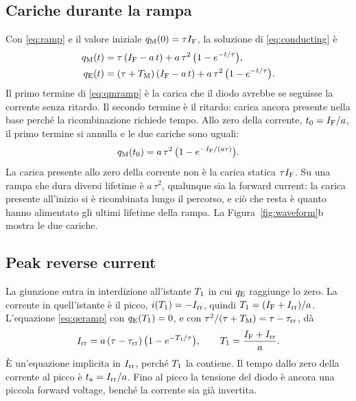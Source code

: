 \documentclass[10pt,a4paper]{scrartcl}
\let\newcommand\lmitdefine
\newcommand{\IF}{I_\mathrm{F}}
\newcommand{\Irr}{I_\mathrm{rr}}
\newcommand{\ta}{t_\mathrm{a}}
\newcommand{\taurr}{\tau_\mathrm{rr}}
\newcommand{\TM}{T_\mathrm{M}}
\newcommand{\Tone}{T_1}
\newcommand{\qE}{q_\mathrm{E}}
\newcommand{\qM}{q_\mathrm{M}}
\begin{document}
\subsection{Cariche durante la rampa}
Con \eqref{eq:ramp} e il valore iniziale $\qM(0) = \tau\IF$, la soluzione di \eqref{eq:conducting} è
\begin{align}
\qM(t) &= \tau\,(\IF - a\,t) + a\,\tau^2\,\bigl(1 - e^{-t/\tau}\bigr) , \label{eq:qmramp}\\
\qE(t) &= (\tau+\TM)\,(\IF - a\,t) + a\,\tau^2\,\bigl(1 - e^{-t/\tau}\bigr) . \label{eq:qeramp}
\end{align}
Il primo termine di \eqref{eq:qmramp} è la carica che il diodo avrebbe se seguisse la corrente senza ritardo. Il secondo termine è il ritardo: carica ancora presente nella base perché la ricombinazione richiede tempo. Allo zero della corrente, $t_0 = \IF/a$, il primo termine si annulla e le due cariche sono uguali:
\begin{equation}
\qM(t_0) = a\,\tau^2\,\bigl(1 - e^{-\IF/(a\tau)}\bigr) .
\label{eq:qzero}
\end{equation}
La carica presente allo zero della corrente non è la carica statica $\tau\IF$. Su una rampa che dura diversi lifetime è $a\,\tau^2$, qualunque sia la forward current: la carica presente all'inizio si è ricombinata lungo il percorso, e ciò che resta è quanto hanno alimentato gli ultimi lifetime della rampa. La Figura~\ref{fig:waveform}b mostra le due cariche.

\subsection{Peak reverse current}
La giunzione entra in interdizione all'istante $\Tone$ in cui $\qE$ raggiunge lo zero. La corrente in quell'istante è il picco, $i(\Tone) = -\Irr$, quindi $\Tone = (\IF+\Irr)/a$. L'equazione \eqref{eq:qeramp} con $\qE(\Tone) = 0$, e con $\tau^2/(\tau+\TM) = \tau - \taurr$, dà
\begin{equation}
\Irr = a\,(\tau-\taurr)\,\bigl(1 - e^{-\Tone/\tau}\bigr) , \qquad \Tone = \frac{\IF+\Irr}{a} .
\label{eq:peak}
\end{equation}
È un'equazione implicita in $\Irr$, perché $\Tone$ la contiene. Il tempo dallo zero della corrente al picco è $\ta = \Irr/a$. Fino al picco la tensione del diodo è ancora una piccola forward voltage, benché la corrente sia già invertita.
\end{document}
